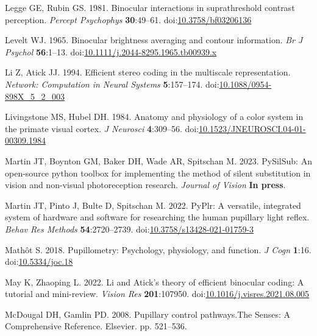 \documentclass[
]{article}
\newlength{\cslhangindent}
\newlength{\cslentryspacingunit} %
\newenvironment{CSLReferences}[2] %
 {%
  \setlength{\parindent}{0pt}
  \ifodd #1
  \let\oldpar\par
  \def\par{\hangindent=\cslhangindent\oldpar}
  \fi
  \setlength{\parskip}{#2\cslentryspacingunit}
 }%
 {}
\begin{document}
\begin{CSLReferences}{1}{0}
\leavevmode{}%
Legge GE, Rubin GS. 1981. Binocular interactions in suprathreshold contrast perception. \emph{Percept Psychophys} \textbf{30}:49--61. doi:\href{https://doi.org/10.3758/bf03206136}{10.3758/bf03206136}

\leavevmode{}%
Levelt WJ. 1965. Binocular brightness averaging and contour information. \emph{Br J Psychol} \textbf{56}:1--13. doi:\href{https://doi.org/10.1111/j.2044-8295.1965.tb00939.x}{10.1111/j.2044-8295.1965.tb00939.x}

\leavevmode{}%
Li Z, Atick JJ. 1994. Efficient stereo coding in the multiscale representation. \emph{Network: Computation in Neural Systems} \textbf{5}:157--174. doi:\href{https://doi.org/10.1088/0954-898X_5_2_003}{10.1088/0954-898X\_5\_2\_003}

\leavevmode{}%
Livingstone MS, Hubel DH. 1984. Anatomy and physiology of a color system in the primate visual cortex. \emph{J Neurosci} \textbf{4}:309--56. doi:\href{https://doi.org/10.1523/JNEUROSCI.04-01-00309.1984}{10.1523/JNEUROSCI.04-01-00309.1984}

\leavevmode{}%
Martin JT, Boynton GM, Baker DH, Wade AR, Spitschan M. 2023. PySilSub: An open-source python toolbox for implementing the method of silent substitution in vision and non-visual photoreception research. \emph{Journal of Vision} \textbf{In press}.

\leavevmode{}%
Martin JT, Pinto J, Bulte D, Spitschan M. 2022. PyPlr: A versatile, integrated system of hardware and software for researching the human pupillary light reflex. \emph{Behav Res Methods} \textbf{54}:2720--2739. doi:\href{https://doi.org/10.3758/s13428-021-01759-3}{10.3758/s13428-021-01759-3}

\leavevmode{}%
Mathôt S. 2018. Pupillometry: Psychology, physiology, and function. \emph{J Cogn} \textbf{1}:16. doi:\href{https://doi.org/10.5334/joc.18}{10.5334/joc.18}

\leavevmode{}%
May K, Zhaoping L. 2022. Li and {Atick's} theory of efficient binocular coding: A tutorial and mini-review. \emph{Vision Res} \textbf{201}:107950. doi:\href{https://doi.org/10.1016/j.visres.2021.08.005}{10.1016/j.visres.2021.08.005}

\leavevmode{}%
McDougal DH, Gamlin PD. 2008. Pupillary control pathways.The Senses: A Comprehensive Reference. Elsevier. pp. 521--536.


\end{CSLReferences}
\end{document}
